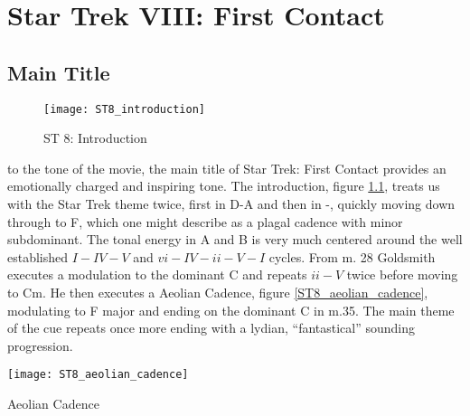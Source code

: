 
\chapter{Star Trek VIII: First Contact}\label{ch:st 8}

\section{Main Title}
\begin{figure}[h!]
\center
\texttt{[image: ST8\_introduction]}
	\caption{ST 8: Introduction}
	\label{ST8_introduction}
\end{figure}
\noindent{} to the tone of the movie, the main title of Star Trek: First Contact provides an emotionally charged and inspiring tone. The introduction, figure \ref{ST8_introduction}, treats us with the Star Trek theme twice, first in D-A and then in \fiss-\ciss, quickly moving down through \bflatm to F, which one might describe as a plagal cadence with minor subdominant. The tonal energy in A and B is very much centered around the well established \(I-IV-V\) and \(vi-IV-ii-V-I\) cycles. 
From m. 28 Goldsmith executes a modulation to the dominant C and repeats \(ii-V\) twice before moving to Cm. He then executes a Aeolian Cadence, figure \ref{ST8_aeolian_cadence}, modulating to F major and ending on the dominant C in m.35. The main theme of the cue repeats once more ending with a lydian, ``fantastical'' sounding progression. 
\begin{marginfigure}
\texttt{[image: ST8\_aeolian\_cadence]}
	\caption{Aeolian Cadence}
	\label{ST8_aeolian_cadence}
\end{marginfigure}

\clearpage


